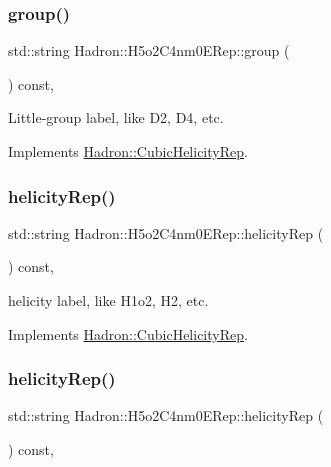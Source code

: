 \subsubsection{\texorpdfstring{group()}{group()}\hspace{0.1cm}{\footnotesize\ttfamily [2/2]}}
{\footnotesize\ttfamily std\+::string Hadron\+::\+H5o2\+C4nm0\+E\+Rep\+::group (\begin{DoxyParamCaption}{ }\end{DoxyParamCaption}) const\hspace{0.3cm}{\ttfamily [inline]}, {\ttfamily [virtual]}}

Little-\/group label, like D2, D4, etc. 

Implements \mbox{\hyperlink{structHadron_1_1CubicHelicityRep_a101a7d76cd8ccdad0f272db44b766113}{Hadron\+::\+Cubic\+Helicity\+Rep}}.

\mbox{\label{structHadron_1_1H5o2C4nm0ERep_aeacbccc4ba507144d830cd8748f79ecb}} 
\subsubsection{\texorpdfstring{helicityRep()}{helicityRep()}\hspace{0.1cm}{\footnotesize\ttfamily [1/2]}}
{\footnotesize\ttfamily std\+::string Hadron\+::\+H5o2\+C4nm0\+E\+Rep\+::helicity\+Rep (\begin{DoxyParamCaption}{ }\end{DoxyParamCaption}) const\hspace{0.3cm}{\ttfamily [inline]}, {\ttfamily [virtual]}}

helicity label, like H1o2, H2, etc. 

Implements \mbox{\hyperlink{structHadron_1_1CubicHelicityRep_af1096946b7470edf0a55451cc662f231}{Hadron\+::\+Cubic\+Helicity\+Rep}}.

\mbox{\label{structHadron_1_1H5o2C4nm0ERep_aeacbccc4ba507144d830cd8748f79ecb}} 
\subsubsection{\texorpdfstring{helicityRep()}{helicityRep()}\hspace{0.1cm}{\footnotesize\ttfamily [2/2]}}
{\footnotesize\ttfamily std\+::string Hadron\+::\+H5o2\+C4nm0\+E\+Rep\+::helicity\+Rep (\begin{DoxyParamCaption}{ }\end{DoxyParamCaption}) const\hspace{0.3cm}{\ttfamily [inline]}, {\ttfamily [virtual]}}

